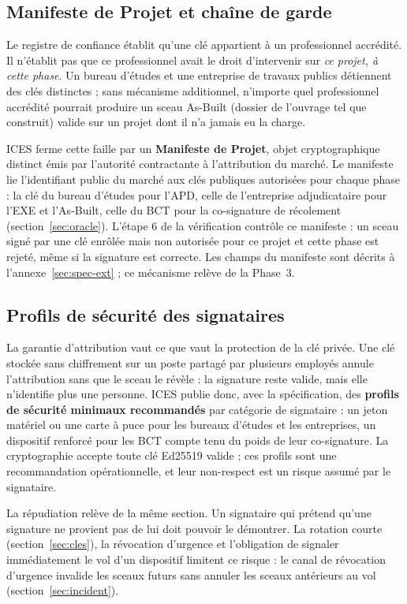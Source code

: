 \documentclass[11pt,a4paper]{article}
\begin{document}
\subsection{Manifeste de Projet et chaîne de garde}\label{sec:garde}

Le registre de confiance établit qu'une clé appartient à un professionnel accrédité. Il n'établit pas que ce professionnel avait le droit d'intervenir sur \emph{ce projet, à cette phase}. Un bureau d'études et une entreprise de travaux publics détiennent des clés distinctes ; sans mécanisme additionnel, n'importe quel professionnel accrédité pourrait produire un sceau As-Built (dossier de l'ouvrage tel que construit) valide sur un projet dont il n'a jamais eu la charge.

ICES ferme cette faille par un \textbf{Manifeste de Projet}, objet cryptographique distinct émis par l'autorité contractante à l'attribution du marché. Le manifeste lie l'identifiant public du marché aux clés publiques autorisées pour chaque phase : la clé du bureau d'études pour l'APD, celle de l'entreprise adjudicataire pour l'EXE et l'As-Built, celle du BCT pour la co-signature de récolement (section~\ref{sec:oracle}). L'étape 6 de la vérification contrôle ce manifeste : un sceau signé par une clé enrôlée mais non autorisée pour ce projet et cette phase est rejeté, même si la signature est correcte. Les champs du manifeste sont décrits à l'annexe~\ref{sec:spec-ext} ; ce mécanisme relève de la Phase~3.

\subsection{Profils de sécurité des signataires}\label{sec:profils}

La garantie d'attribution vaut ce que vaut la protection de la clé privée. Une clé stockée sans chiffrement sur un poste partagé par plusieurs employés annule l'attribution sans que le sceau le révèle : la signature reste valide, mais elle n'identifie plus une personne. ICES publie donc, avec la spécification, des \textbf{profils de sécurité minimaux recommandés} par catégorie de signataire : un jeton matériel ou une carte à puce pour les bureaux d'études et les entreprises, un dispositif renforcé pour les BCT compte tenu du poids de leur co-signature. La cryptographie accepte toute clé Ed25519 valide ; ces profils sont une recommandation opérationnelle, et leur non-respect est un risque assumé par le signataire.

La répudiation relève de la même section. Un signataire qui prétend qu'une signature ne provient pas de lui doit pouvoir le démontrer. La rotation courte (section~\ref{sec:cles}), la révocation d'urgence et l'obligation de signaler immédiatement le vol d'un dispositif limitent ce risque : le canal de révocation d'urgence invalide les sceaux futurs sans annuler les sceaux antérieurs au vol (section~\ref{sec:incident}).
\end{document}
